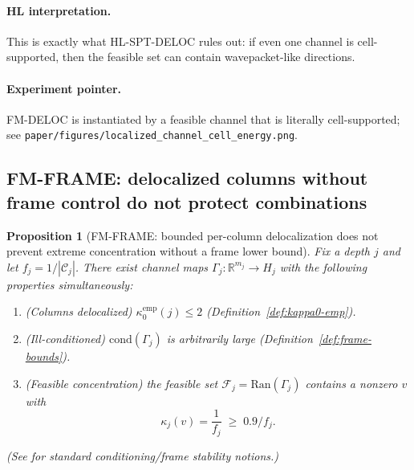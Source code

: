 \documentclass[11pt]{article}
\newcommand{\Ran}{\mathrm{Ran}}
\newtheorem{proposition}[definition]{Proposition}
\begin{document}
\paragraph{HL interpretation.}
This is exactly what HL-SPT-DELOC rules out: if even one channel is cell-supported, then the feasible set can contain wavepacket-like directions.

\paragraph{Experiment pointer.}
FM-DELOC is instantiated by a feasible channel that is literally cell-supported; see \nolinkurl{paper/figures/localized_channel_cell_energy.png}.

\subsection{FM-FRAME: delocalized columns without frame control do not protect combinations}

\begin{proposition}[FM-FRAME: bounded per-column delocalization does not prevent extreme concentration without a frame lower bound]\label{prop:fm-frame}
Fix a depth $j$ and let $f_j=1/|\mathcal{C}_j|$.
There exist channel maps $\Gamma_j:\mathbb{R}^{m_j}\to H_j$ with the following properties simultaneously:
\begin{enumerate}
\item (\emph{Columns delocalized}) $\kappa^{\mathrm{emp}}_0(j)\le 2$ (Definition~\ref{def:kappa0-emp}).
\item (\emph{Ill-conditioned}) $\mathrm{cond}(\Gamma_j)$ is arbitrarily large (Definition~\ref{def:frame-bounds}).
\item (\emph{Feasible concentration}) the feasible set $\mathcal{F}_j=\Ran(\Gamma_j)$ contains a nonzero $v$ with
\[
\kappa_j(v)=\frac{1}{f_j}\;\ge\; 0.9/f_j.
\]
\end{enumerate}
(See \cite{Christensen2016Frames} for standard conditioning/frame stability notions.)
\end{proposition}
\end{document}
